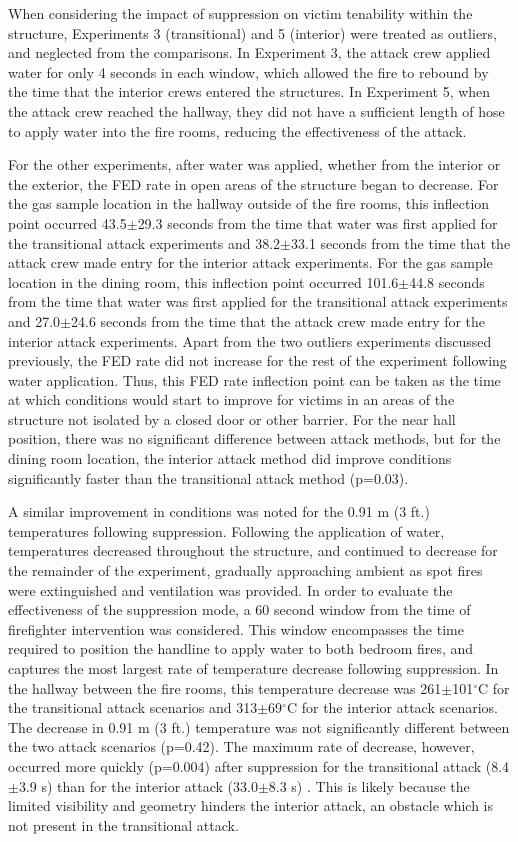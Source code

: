 \documentclass[12pt,oneside]{article}
\begin{document}
When considering the impact of suppression on victim tenability within the structure, Experiments 3 (transitional) and 5 (interior) were treated as outliers, and neglected from the comparisons. In Experiment 3, the attack crew applied water for only 4 seconds in each window, which allowed the fire to rebound by the time that the interior crews entered the structures. In Experiment 5, when the attack crew reached the hallway, they did not have a sufficient length of hose to apply water into the fire rooms, reducing the effectiveness of the attack. 

For the other experiments, after water was applied, whether from the interior or the exterior, the FED rate in open areas of the structure began to decrease. For the gas sample location in the hallway outside of the fire rooms, this inflection point occurred 43.5$\pm$29.3 seconds from the time that water was first applied for the transitional attack experiments and 38.2$\pm$33.1 seconds from the time that the attack crew made entry for the interior attack experiments. For the gas sample location in the dining room, this inflection point occurred 101.6$\pm$44.8 seconds from the time that water was first applied for the transitional attack experiments and 27.0$\pm$24.6 seconds from the time that the attack crew made entry for the interior attack experiments. Apart from the two outliers experiments discussed previously, the FED rate did not increase for the rest of the experiment following water application. Thus, this FED rate inflection point can be taken as the time at which conditions would start to improve for victims in an areas of the structure not isolated by a closed door or other barrier. For the near hall position, there was no significant difference between attack methods, but for the dining room location, the interior attack method did improve conditions significantly faster than the transitional attack method (p=0.03). 

A similar improvement in conditions was noted for the 0.91 m (3 ft.) temperatures following suppression. Following the application of water, temperatures decreased throughout the structure, and continued to decrease for the remainder of the experiment, gradually approaching ambient as spot fires were extinguished and ventilation was provided. In order to evaluate the effectiveness of the suppression mode, a 60 second window from the time of firefighter intervention was considered. This window encompasses the time required to position the handline to apply water to both bedroom fires, and captures the most largest rate of temperature decrease following suppression. In the hallway between the fire rooms, this temperature decrease was 261$\pm$101$^{\circ}$C for the transitional attack scenarios and 313$\pm$69$^{\circ}$C for the interior attack scenarios. The decrease in 0.91 m (3 ft.) temperature was not significantly different between the two attack scenarios (p=0.42). The maximum rate of decrease, however, occurred more quickly (p=0.004) after suppression for the transitional attack (8.4$\pm$3.9 s) than for the interior attack (33.0$\pm$8.3 s) . This is likely because the limited visibility and geometry hinders the interior attack, an obstacle which is not present in the transitional attack. 
\end{document}
